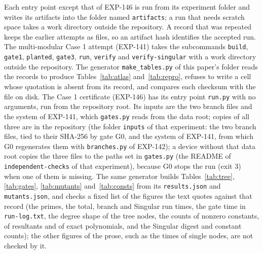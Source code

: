 \documentclass[11pt]{article}
\theoremstyle{remark}
\begin{document}
Each entry point except that of EXP-146 is run from its experiment folder and writes its artifacts into the folder named \texttt{artifacts}; a run that needs scratch space
takes a work directory outside the repository. A record that was repeated keeps the earlier attempts as files, so an artifact hash identifies the accepted run. The multi-modular Case 1 attempt (EXP-141) takes the
subcommands \texttt{build}, \texttt{gate1}, \texttt{planted}, \texttt{gate3}, \texttt{run}, \texttt{verify} and
\texttt{verify-singular} with a work directory outside the repository. The generator
\texttt{make\_tables.py} of this paper's folder reads the records to produce Tables~\ref{tab:atlas}
and~\ref{tab:repro}, refuses to write a cell whose quotation is absent from its record, and compares each
checksum with the file on disk. The Case 1 certificate (EXP-146) has its entry point \texttt{run.py} with no arguments, run from the repository root. Its inputs are the two branch files and the system of EXP-141, which \texttt{gates.py} reads from the data root; copies of all three are in the repository (the folder \texttt{inputs} of that experiment: the two branch files, tied to their SHA-256 by gate G0, and the system of EXP-141, from which G0 regenerates them with \texttt{branches.py} of EXP-142); a device without that data root copies the three files to the paths set in \texttt{gates.py} (the README of \texttt{independent-checks} of that experiment), because G0 stops the run (exit 3) when one of them is missing. The same generator builds Tables~\ref{tab:tree},
\ref{tab:gates}, \ref{tab:mutants} and~\ref{tab:consts} from its \texttt{results.json} and \texttt{mutants.json}, and checks a fixed list of the figures the text quotes against that record (the primes, the total, branch and Singular run times, the gate time in \texttt{run-log.txt}, the degree shape of the tree nodes, the counts of nonzero constants, of resultants and of exact polynomials, and the Singular digest and constant counts); the other figures of the prose, such as the times of single nodes, are not checked by it.

\begin{table}[tbp]
\centering
\caption{Entry points and artifact checksums of the procedures A1 to A7. A checksum is the first sixteen hexadecimal digits of the SHA-256 of the artifact file, compared with the digit string printed in the record where the record prints one; n/r marks an artifact whose checksum the record does not print.}\label{tab:repro}

\end{table}
\end{document}
